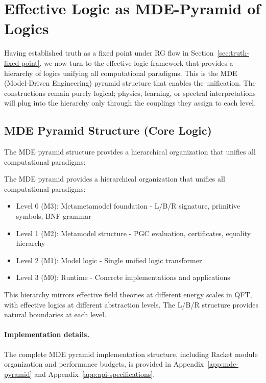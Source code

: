 \section{Effective Logic as MDE-Pyramid of Logics}
\label{sec:effective-logic}

Having established truth as a fixed point under RG flow in Section~\ref{sec:truth-fixed-point}, we now turn to the effective logic framework that provides a hierarchy of logics unifying all computational paradigms. This is the MDE (Model-Driven Engineering) pyramid structure that enables the unification. The constructions remain purely logical; physics, learning, or spectral interpretations will plug into the hierarchy only through the couplings they assign to each level.

\subsection{MDE Pyramid Structure (Core Logic)}

The MDE pyramid structure provides a hierarchical organization that unifies all computational paradigms:

\begin{definition}
\label{def:mde-pyramid-lbr}
The MDE pyramid provides a hierarchical organization that unifies all computational paradigms:
\begin{itemize}
\item Level 0 (M3): Metametamodel foundation - L/B/R signature, primitive symbols, BNF grammar
\item Level 1 (M2): Metamodel structure - PGC evaluation, certificates, equality hierarchy
\item Level 2 (M1): Model logic - Single unified logic transformer
\item Level 3 (M0): Runtime - Concrete implementations and applications
\end{itemize}
\end{definition}

This hierarchy mirrors effective field theories at different energy scales in QFT, with effective logics at different abstraction levels. The L/B/R structure provides natural boundaries at each level.

\paragraph{Implementation details.} The complete MDE pyramid implementation structure, including Racket module organization and performance budgets, is provided in Appendix~\ref{app:mde-pyramid} and Appendix~\ref{app:api-specifications}.

